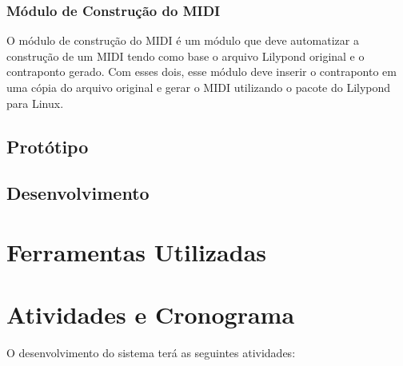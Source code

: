     \subsubsection[Módulo de Construção do MIDI]{Módulo de Construção do MIDI}

      O módulo de construção do MIDI é um módulo que deve automatizar a construção de um MIDI tendo como base o arquivo Lilypond original e o contraponto gerado. Com esses dois, esse módulo deve inserir o contraponto em uma cópia do arquivo original e gerar o MIDI utilizando o pacote do Lilypond para Linux.

  \subsection[Protótipo]{Protótipo}



  \subsection[Desenvolvimento]{Desenvolvimento}


  \section[Ferramentas Utilizadas]{Ferramentas Utilizadas}


  \section[Atividades e Cronograma]{Atividades e Cronograma}

  O desenvolvimento do sistema terá as seguintes atividades:

